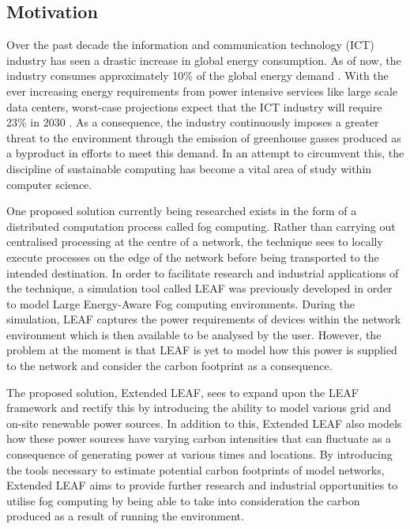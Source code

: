 \documentclass{l4proj}
\begin{document}

\subsection{Motivation}\label{intro:subsec:motivation}
Over the past decade the information and communication technology (ICT) industry has seen a drastic increase in global energy consumption.
As of now, the industry consumes approximately 10\% of the global energy demand \citep{current_energy_consumption}.
With the ever increasing energy requirements from power intensive services like large scale data centers, worst-case projections expect that the ICT industry will require 23\% in 2030 \citep{c02challenges}.
As a consequence, the industry continuously imposes a greater threat to the environment through the emission of greenhouse gasses produced as a byproduct in efforts to meet this demand.
In an attempt to circumvent this, the discipline of sustainable computing has become a vital area of study within computer science.

One proposed solution currently being researched exists in the form of a distributed computation process called fog computing.
Rather than carrying out centralised processing at the centre of a network, the technique sees to locally execute processes on the edge of the network before being transported to the intended destination.
In order to facilitate research and industrial applications of the technique, a simulation tool called LEAF was previously developed in order to model Large Energy-Aware Fog computing environments.
During the simulation, LEAF captures the power requirements of devices within the network environment which is then available to be analysed by the user.
However, the problem at the moment is that LEAF is yet to model how this power is supplied to the network and consider the carbon footprint as a consequence.

The proposed solution, Extended LEAF, sees to expand upon the LEAF framework and rectify this by introducing the ability to model various grid and on-site renewable power sources.
In addition to this, Extended LEAF also models how these power sources have varying carbon intensities that can fluctuate as a consequence of generating power at various times and locations.
By introducing the tools necessary to estimate potential carbon footprints of model networks, Extended LEAF aims to provide further research and industrial opportunities to utilise fog computing by being able to take into consideration the carbon produced as a result of running the environment.
\end{document}
